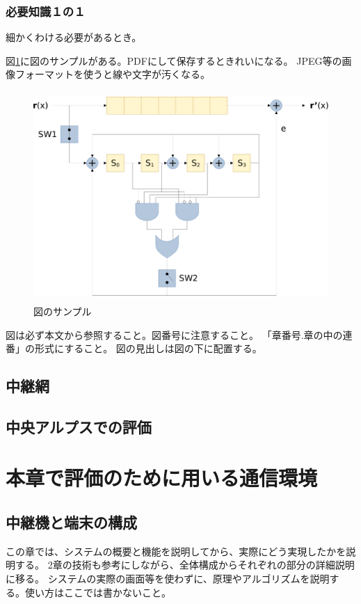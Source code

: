 \documentclass[12pt]{jreport}
\begin{document}
\subsection{必要知識１の１}
細かくわける必要があるとき。

図\ref{fig:pm1}に図のサンプルがある。PDFにして保存するときれいになる。
JPEG等の画像フォーマットを使うと線や文字が汚くなる。

\begin{figure}[htb]
    \begin{center}
        \includegraphics[width=12cm,height=8cm]{decode7_4_10111_no_margin-crop.pdf}
    \end{center}
    \caption{図のサンプル
        \label{fig:pm1}
    }
\end{figure}

図は必ず本文から参照すること。図番号に注意すること。
「章番号.章の中の連番」の形式にすること。
図の見出しは図の下に配置する。

\section{中継網}
\section{中央アルプスでの評価}

\chapter{本章で評価のために用いる通信環境}
\section{中継機と端末の構成}
この章では、システムの概要と機能を説明してから、実際にどう実現したかを説明する。
2章の技術も参考にしながら、全体構成からそれぞれの部分の詳細説明に移る。
システムの実際の画面等を使わずに、原理やアルゴリズムを説明する。使い方はここでは書かないこと。
\end{document}
